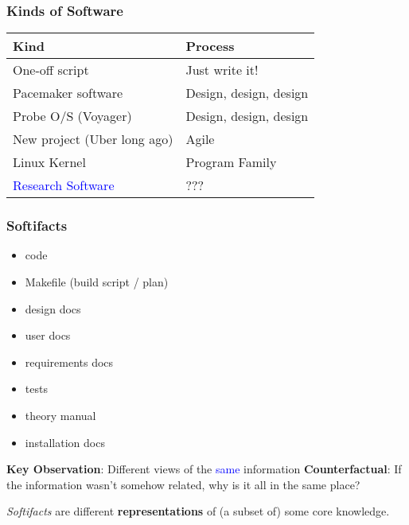 \documentclass{beamer}
\begin{document}
\begin{frame}

\frametitle{Kinds of Software}

\begin{tabular}{|l|l|}
\hline 
\textbf{Kind} & \textbf{Process} \\ \hline\noalign{\pause}
One-off script & Just write it! \\ \hline\noalign{\pause}
Pacemaker software & Design, design, design \\ \hline\noalign{\pause}
Probe O/S (Voyager) & Design, design, design \\ \hline\noalign{\pause}
New project (Uber long ago) & Agile \\ \hline\noalign{\pause}
Linux Kernel & Program Family \\ \hline\noalign{\pause}
\textcolor{blue}{Research Software} & ??? \\ \hline
\end{tabular}

\end{frame}



\begin{frame}

\frametitle{Softifacts}

\begin{itemize}
\item code
\item Makefile (build script / plan)
\item design docs
\item user docs
\item requirements docs
\item tests
\item theory manual
\item installation docs
\end{itemize}
\pause

\textbf{Key Observation}: Different views of the \textcolor{blue}{same}
information
\pause
\textbf{Counterfactual}: If the information wasn't somehow related, why is
it all in the same place?
\pause
\begin{definition}
\emph{Softifacts} are different \textbf{representations} of 
(a subset of) some core knowledge.
\end{definition}

\end{frame}

\end{document}
